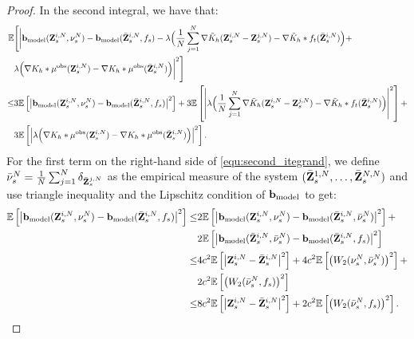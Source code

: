 \begin{proof}
In the second integral, we have that:
\begin{equation}
\label{equ:second_itegrand}
\begin{aligned}
\mathbb E &\Bigg[\bigg|\mathbf{b}_\mathrm{model}(\mathbf{Z}^{i,N}_s,\nu_s^N) - \mathbf{b}_\mathrm{model}(\bar{\mathbf{Z}}^{i,N}_s, f_s) - \lambda \Big(\frac{1}{N}\sum_{j=1}^N \nabla \tilde  K_h(\mathbf{Z}^{i,N}_s - \mathbf{Z}^{j,N}_s) - \nabla\tilde{K}_h*f_t(\bar{\mathbf{Z}}^{i,N}_s)  \Big) +\\&\lambda\Big(\nabla   K_h *\mu^{\mathrm{obs}} (\mathbf{Z}^{i,N}_s) - \nabla   K_h *\mu^{\mathrm{obs}} (\bar{\mathbf{Z}}^{i,N}_s)\Big)\bigg|^2\Bigg] \\
\leq & 3 \mathbb E \left[\left|\mathbf{b}_\mathrm{model}(\mathbf{Z}^{i,N}_s,\nu_s^N) - \mathbf{b}_\mathrm{model}(\bar{\mathbf{Z}}^{i,N}_s, f_s)\right|^2\right] + 3 \mathbb E \left[\left|\lambda \Big(\frac{1}{N}\sum_{j=1}^N \nabla \tilde  K_h(\mathbf{Z}^{i,N}_s - \mathbf{Z}^{j,N}_s) - \nabla\tilde{K}_h*f_t(\bar{\mathbf{Z}}^{i,N}_s)  \Big) \right|^2\right] + \\&
3\mathbb E \left[\left|\lambda\Big(\nabla   K_h *\mu^{\mathrm{obs}} (\mathbf{Z}^{i,N}_s) - \nabla   K_h *\mu^{\mathrm{obs}} (\bar{\mathbf{Z}}^{i,N}_s)\Big)\right|^2\right].
\end{aligned}
\end{equation}
For the first term on the right-hand side of \eqref{equ:second_itegrand}, we define $\bar{\nu}^N_s = \frac{1}{N}\sum_{j=1}^N \delta_{\bar{\mathbf{Z}}^{j,N}_s}$ as the empirical measure of the system $(\bar{\mathbf{Z}}^{1,N}_s,\dots,\bar{\mathbf{Z}}^{N,N}_s)$ and use triangle inequality and the Lipschitz condition of $\mathbf{b}_\textrm{model}$ to get:
\begin{equation}
\label{equ:bmodel}
\begin{aligned}
\mathbb E \left[\left|\mathbf{b}_\mathrm{model}(\mathbf{Z}^{i,N}_s,\nu_s^N) - \mathbf{b}_\mathrm{model}(\bar{\mathbf{Z}}^{i,N}_s, f_s)\right|^2\right] \leq &2 \mathbb E \left[\left|\mathbf{b}_\mathrm{model}(\mathbf{Z}^{i,N}_s,\nu_s^N) - \mathbf{b}_\mathrm{model}(\bar{\mathbf{Z}}^{i,N}_s, \bar{\nu}^N_s)\right|^2\right] +\\& 2\mathbb E \left[\left|\mathbf{b}_\mathrm{model}(\bar{\mathbf{Z}}^{i,N}_s, \bar{\nu}^N_s) - \mathbf{b}_\mathrm{model}(\bar{\mathbf{Z}}^{i,N}_s, f_s)\right|^2\right]\\
\leq & 4c^2 \mathbb E\left[\left|\mathbf{Z}^{i,N}_s-\bar{\mathbf{Z}}^{i,N}_s\right|^2\right] + 4c^2 \mathbb E \left[\left(W_2(\nu^N_s,\bar{\nu}^N_s)\right)^2\right] + \\
& 2c^2 \mathbb E \left[\left(W_2(\bar{\nu}^N_s,f_s)\right)^2\right]\\
\leq & 8c^2 \mathbb E\left[\left|\mathbf{Z}^{i,N}_s-\bar{\mathbf{Z}}^{i,N}_s\right|^2\right] + 2c^2 \mathbb E \left[\left(W_2(\bar{\nu}^N_s,f_s)\right)^2\right].
\end{aligned}
\end{equation}


\end{proof}
